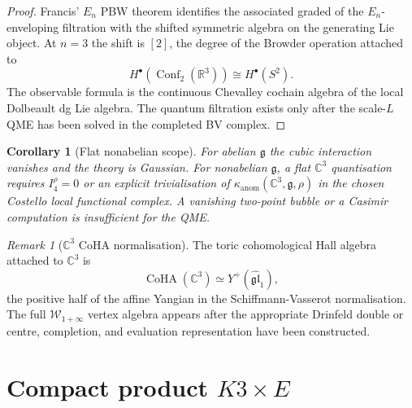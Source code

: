 \documentclass[11pt]{amsart}
\providecommand{\C}{\mathbb{C}}
\providecommand{\R}{\mathbb{R}}
\providecommand{\gfrak}{\mathfrak{g}}
\providecommand{\CoHA}{\operatorname{CoHA}}
\providecommand{\Yp}{Y^{+}}
\providecommand{\Woneinf}{\mathcal{W}_{1+\infty}}
\providecommand{\kanom}{\kappa_{\operatorname{anom}}}
\theoremstyle{plain}
\newtheorem{corollary}[theorem]{Corollary}
\theoremstyle{definition}
\theoremstyle{remark}
\newtheorem{remark}[theorem]{Remark}
\begin{document}
\begin{proof}
Francis' \(E_n\) PBW theorem identifies the associated graded of the
\(E_n\)-enveloping filtration with the shifted symmetric algebra on the
generating Lie object.  At \(n=3\) the shift is \([2]\), the degree of
the Browder operation attached to
\[
  H^\bullet(\operatorname{Conf}_2(\R^3))\cong H^\bullet(S^2).
\]
The observable formula is the continuous Chevalley cochain algebra of
the local Dolbeault dg Lie algebra.  The quantum filtration exists only
after the scale-\(L\) QME has been solved in the completed BV complex.
\end{proof}

\begin{corollary}[Flat nonabelian scope]
\label{cor:flat-nonabelian-scope}
For abelian \(\gfrak\) the cubic interaction vanishes and the theory is
Gaussian.  For nonabelian \(\gfrak\), a flat \(\C^3\) quantisation
requires \(I_4^\rho=0\) or an explicit trivialisation of
\(\kanom(\C^3,\gfrak,\rho)\) in the chosen Costello local functional
complex.  A vanishing two-point bubble or a Casimir computation is
insufficient for the QME.
\end{corollary}

\begin{remark}[\(\C^3\) CoHA normalisation]
\label{rem:c3-coha-normalisation}
The toric cohomological Hall algebra attached to \(\C^3\) is
\[
  \CoHA(\C^3)\simeq \Yp(\widehat{\mathfrak{gl}}_1),
\]
the positive half of the affine Yangian in the Schiffmann-Vasserot
normalisation.  The full \(\Woneinf\) vertex algebra appears after the
appropriate Drinfeld double or centre, completion, and evaluation
representation have been constructed.
\end{remark}

\section{Compact product \texorpdfstring{$K3\times E$}{K3 x E}}
\label{sec:compact-k3e}
\end{document}
